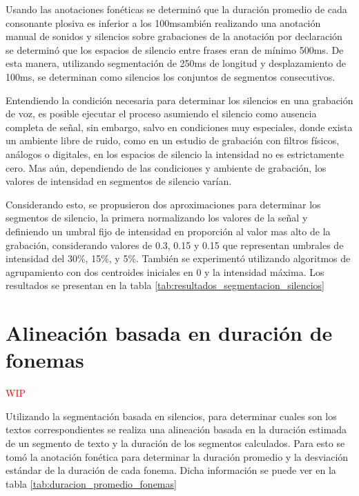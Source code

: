 Usando las anotaciones fonéticas se determinó que la duración promedio de cada consonante plosiva es inferior a los 100msambién\macb{,} realizando una anotación manual de sonidos y silencios sobre grabaciones de la anotación por declaración\macb{,} se determinó que los espacios de silencio entre frases eran de mínimo 500ms. De esta manera, utilizando segmentación de 250ms de longitud y desplazamiento de 100ms, se determinan como silencios los conjuntos de  segmentos consecutivos. 

Entendiendo la condición necesaria para determinar los silencios en una grabación de voz, es posible ejecutar el proceso asumiendo el silencio como ausencia completa de señal, sin embargo, salvo en condiciones muy especiales, donde exista un ambiente libre de ruido, como en un estudio de grabación con filtros físicos, análogos o digitales, en los espacios de silencio la intensidad no es estrictamente cero.  Mas aún, dependiendo de las condiciones y ambiente de grabación, los valores de intensidad en segmentos de silencio varían.

Considerando esto, se propusieron dos aproximaciones para determinar los segmentos de silencio, la primera normalizando los valores de la señal y definiendo un umbral fijo de intensidad en proporción al valor mas alto de la grabación, considerando valores de 0.3, 0.15 y 0.15 que representan umbrales de intensidad del 30\%, 15\%, y 5\%. También se experimentó utilizando algoritmos de agrupamiento con dos centroides iniciales en 0 y la intensidad máxima. Los resultados se presentan en la tabla \ref{tab:resultados_segmentacion_silencios}




\section{Alineación basada en duración de fonemas}

\textcolor{red}{WIP}

Utilizando la segmentación basada en silencios, para determinar cuales son los textos correspondientes se realiza una alineación basada en la duración estimada de un segmento de texto y la duración de los segmentos calculados. Para esto se tomó la anotación fonética para determinar la duración promedio y la desviación estándar de la duración de cada fonema.  Dicha información se puede ver en la tabla \ref{tab:duracion_promedio_fonemas} 

